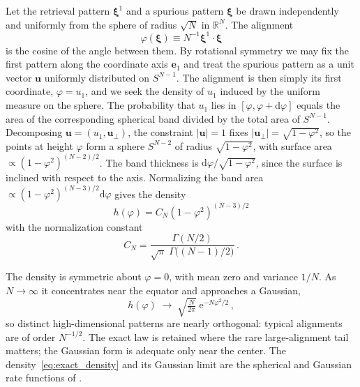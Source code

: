\documentclass[letterpaper]{article} %
\newcommand{\bxi}{\boldsymbol{\xi}}
\newcommand{\e}{{\mathrm{e}}}
\newcommand{\dd}{{\mathrm{d}}}
\begin{document}
Let the retrieval pattern $\bxi^1$ and a spurious pattern $\bxi$ be drawn independently
and uniformly from the sphere of radius $\sqrt N$ in $\mathbb{R}^N$. The alignment
\begin{equation}
    \varphi(\bxi) \equiv N^{-1} \bxi^1\cdot\bxi
\end{equation}
is the cosine of the angle between them. By rotational symmetry we may fix the first pattern
along the coordinate axis $\bm e_1$ and treat the spurious pattern as a unit vector $\bm u$
uniformly distributed on $S^{N-1}$.
The alignment is then simply its first coordinate, $\varphi=u_1$, and we seek the density of 
$u_1$ induced by the uniform measure on the sphere.
The probability that $u_1$ lies in $[\varphi,\varphi+\dd\varphi]$ equals the area of the corresponding 
spherical band divided by the total area of $S^{N-1}$. Decomposing $\bm u=(u_1,\bm u_\perp)$, 
the constraint $|\bm u|=1$ fixes $|\bm u_\perp|=\sqrt{1-\varphi^2}$, so the points at height 
$\varphi$ form a sphere $S^{N-2}$ of radius $\sqrt{1-\varphi^2}$, with surface area
$\propto (1-\varphi^2)^{(N-2)/2}$. The band thickness is $\dd\varphi/\sqrt{1-\varphi^2}$, 
since the surface is inclined with respect to the axis. Normalizing the band area
$\propto(1-\varphi^2)^{(N-3)/2}\dd\varphi$ gives the density
\begin{equation}
h(\varphi)=C_N(1-\varphi^2)^{(N-3)/2}
\label{eq:exact_density}
\end{equation}
with the normalization constant
\begin{equation}
C_N=\frac{\Gamma(N/2)}{\sqrt\pi\;\Gamma\!\big((N-1)/2\big)}\,.
\end{equation}

The density is symmetric about $\varphi=0$, with mean zero and variance $1/N$. As $N\to\infty$ it 
concentrates near the equator and approaches a Gaussian,
\begin{equation}
    h(\varphi)\;\longrightarrow \;\sqrt{\tfrac{N}{2\pi}} \; \e^{-N\varphi^2/2}\,,
    \label{eq:gaussian} 
\end{equation}
so distinct high-dimensional patterns are nearly orthogonal: typical alignments are of order $N^{-1/2}$. 
The exact law is retained where the rare large-alignment tail matters;
the Gaussian form is adequate only near the center.
The density~\eqref{eq:exact_density} and its Gaussian limit are the spherical
and Gaussian rate functions of \citet{lucibello2024exponential}.
\end{document}
